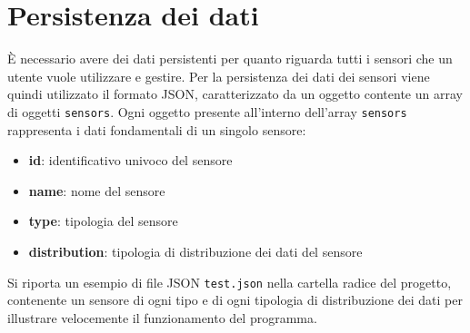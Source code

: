 \documentclass[a4paper, 12pt]{article}
\begin{document}
    \section{Persistenza dei dati}
    È necessario avere dei dati persistenti per quanto riguarda tutti i sensori che un utente vuole utilizzare e gestire.
    Per la persistenza dei dati dei sensori viene quindi utilizzato il formato JSON, caratterizzato da un oggetto contente un array di oggetti \texttt{sensors}. 
    Ogni oggetto presente all'interno dell'array \texttt{sensors} rappresenta i dati fondamentali di un singolo sensore:
    \begin{itemize}
    \item \textbf{id}: identificativo univoco del sensore
    \item \textbf{name}: nome del sensore
    \item \textbf{type}: tipologia del sensore
    \item \textbf{distribution}: tipologia di distribuzione dei dati del sensore
    \end{itemize}
    Si riporta un esempio di file JSON \texttt{test.json} nella cartella radice del progetto, contenente un sensore di ogni tipo e di ogni tipologia di distribuzione dei dati 
    per illustrare velocemente il funzionamento del programma.
\end{document}
